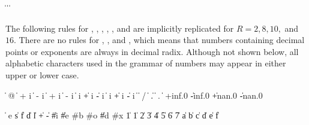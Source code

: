 \begin{grammar}%
 \:  \| 
   \>  \|  \| 
\end{grammar}

The following rules for , , , , , and 
are implicitly replicated for \hbox{$R = 2, 8, 10,$}
and $16$.  There are no rules for , , and , which means that numbers containing
decimal points or exponents are always in decimal radix.
Although not shown below, all alphabetic characters used in the grammar
of numbers may appear in either upper or lower case.
\begin{grammar}%
 \:  
 \: %
      \|  @ 
   \> \|  +  i %
      \|  -  i
   \> \|  + i %
      \|  - i %
      \|   i 
   \> \| +  i %
      \| -  i
   \> \|  i %
      \| + i %
      \| - i
 \:  
   \> \| 
 \: %
   \> \|  / 
   \> \| 
 \: %
          
   \> \| .  
   \> \|  .  
 \: 
 \: %
          
   \> \|  
 \: +inf.0 \| -inf.0 \| +nan.0 \| -nan.0
\end{grammar}

\begin{grammar}%
 \:  
   \> \|   
 \: e \| s \| f \| d \| l
 \:   \| + \|  -
 \:  \| \#i \| \#e
 \: \#b
 \: \#o
 \:  \| \#d
 \: \#x
  \| 1
  \| 1 \| 2 \| 3 \| 4 \| 5 \| 6 \| 7
 \: 
 \:  \| a \| b \| c \| d \| e \| f %
\end{grammar}


